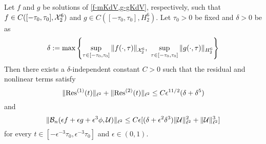 \begin{lem}\label{residual-nonlinearity-bounds}
	Let \(f\) and \(g\) be solutions of \cref{f-mKdV,g-gKdV}, respectively, such that \(f\in C([-\tau_0, \tau_0] , \mathcal{X}^6_2)\) and \(g\in C([-\tau_0,\tau_0], H^6_2)\). Let \(\tau_0 > 0\) be fixed and \(\delta>0\) be as \begin{equation}\label{delta-defn}
		\delta := \max \left\{\sup_{\tau\in[-\tau_0, \tau_0]}\|f(\cdot,\tau)\|_{\mathcal{X}^6_2},\ \sup_{\tau\in[-\tau_0, \tau_0]} \|g(\cdot, \tau)\|_{H^6_2} \right\}
	\end{equation}
 	Then there exists a \(\delta\)-independent constant \(C>0\) such that the residual and nonlinear terms satisfy
	\begin{equation}\label{res-ineq}
		\| \mathrm{Res}^{(1)}(t) \|_{\ell^2} + \|\mathrm{Res}^{(2)}(t) \|_{\ell^2} \leq C \epsilon^{11/2} (\delta + \delta^5)
	\end{equation}
	and 
	\begin{equation}\label{nonlinear-ineq}
		\| \mathcal B_n(\epsilon f + \epsilon g + \epsilon^3 \phi, \mathcal U) \|_{\ell^2} \leq C\epsilon [ (\delta+\epsilon^2\delta^3) \|\mathcal{U}\|_{\ell^2} ^2 + \|\mathcal{U}\|_{\ell^2}^3]
	\end{equation}
	for every \(t\in[-\epsilon^{-3} \tau_0, \epsilon^{-3} \tau_0]\) and \(\epsilon \in (0,1).\)
\end{lem}

